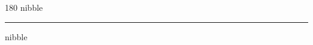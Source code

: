 
\begin{frame}
\begin{center}
\begin{turn}{180}
{\fontsize{2.5cm}{1em}\selectfont nibble}
\end{turn}
\vspace{1em}\par  
\hrule
\vspace{1em}\par  
{\fontsize{2.5cm}{1em}\selectfont nibble}
\end{center}
\end{frame}
